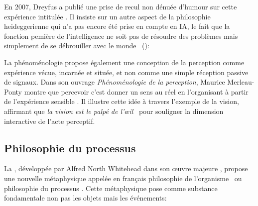 En 2007, Dreyfus a publié une prise de recul non dénuée d'humour sur cette expérience intitulée \og {} \fg. 
Il insiste sur un autre aspect de la philosophie heideggerienne qui n'a pas encore été prise en compte en IA, le fait que la fonction pemière de l'intelligence ne soit pas de résoudre des problèmes mais simplement de \og se débrouiller avec le monde \fg\ ():

\begin{quote}
	\cite[p.~1146]{dreyfus_why_2007}
\end{quote}

La phénoménologie propose également une conception de la perception comme expérience vécue, incarnée et située, et non comme une simple  réception passive de signaux. 
Dans son ouvrage \emph{Phénoménologie de la perception}, Maurice Merleau-Ponty montre que percevoir c'est donner un sens au réel en l'organisant à partir de l'expérience sensible \cite{merleau-ponty_phenomenologie_2021}. 
Il illustre cette idée à travers l'exemple de la vision, affirmant que \og \emph{la vision est le palpé de l’œil} \fg\ pour souligner la dimension interactive de l'acte perceptif. 



\subsection{Philosophie du processus}

\noindent
La , développée par Alfred North Whitehead dans son œuvre majeure \og {} \fg, propose une nouvelle métaphysique appelée en français \og philosophie de l'organisme \fg\ ou \og philosophie du processus \fg. 
Cette métaphysique pose comme substance fondamentale non pas les objets mais les événements:


\begin{quote}
	\cite{whitehead_process_1929}
\end{quote}

